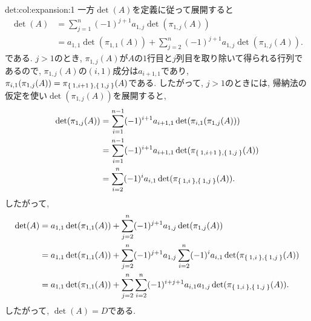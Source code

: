 \begin{proofof}{det:col:expansion:1}
  一方$\det(A)$を定義に従って展開すると
  \begin{align*}
    \det(A)
    &=\sum_{j=1}^{n}
      (-1)^{j+1}a_{1,j}\det(\pi_{1,j}(A))\\
    &=a_{1,1}\det(\pi_{1,1}(A))
    +\sum_{j=2}^{n}(-1)^{j+1}a_{1,j}\det(\pi_{1,j}(A)).
  \end{align*}
  である.
  $j>1$のとき,
  $\pi_{1,j}(A)$が$A$の$1$行目と$j$列目を取り除いて得られる行列であるので,
  $\pi_{1,j}(A)$の$(i,1)$成分は$a_{i+1,1}$であり,
  $\pi_{i,1}(\pi_{1,j}(A))=\pi_{\Set{1,i+1},\Set{1,j}}(A)$である.
  したがって, $j>1$のときには,
  帰納法の仮定を使い$\det(\pi_{1,j}(A))$を展開すると,
  \begin{align*}
    \det(\pi_{1,j}(A))
    &=
    \sum_{i=1}^{n-1}
    (-1)^{i+1}a_{i+1,1}\det(\pi_{i,1}(\pi_{1,j}(A)))\\
    &=
    \sum_{i=1}^{n-1}
    (-1)^{i+1}a_{i+1,1}\det(\pi_{\Set{1,i+1},\Set{1,j}}(A))\\
    &=
    \sum_{i=2}^{n}
    (-1)^{i}a_{i,1}\det(\pi_{\Set{1,i},\Set{1,j}}(A)).
  \end{align*}
  したがって,
  \begin{align*}
    \det(A)
    &=
    a_{1,1}\det(\pi_{1,1}(A))
    +\sum_{j=2}^{n}(-1)^{j+1}a_{1,j}\det(\pi_{1,j}(A))\\
    &=
    a_{1,1}\det(\pi_{1,1}(A))
    +\sum_{j=2}^{n}(-1)^{j+1}a_{1,j}\sum_{i=2}^{n}
    (-1)^{i}a_{i,1}\det(\pi_{\Set{1,i},\Set{1,j}}(A))
  \\
    &=
    a_{1,1}\det(\pi_{1,1}(A))
    +\sum_{j=2}^{n}\sum_{i=2}^{n}
    (-1)^{i+j+1}
    a_{i,1}a_{1,j}\det(\pi_{\Set{1,i},\Set{1,j}}(A)).
  \end{align*}
  したがって, $\det(A)=D$である.
\end{proofof}

